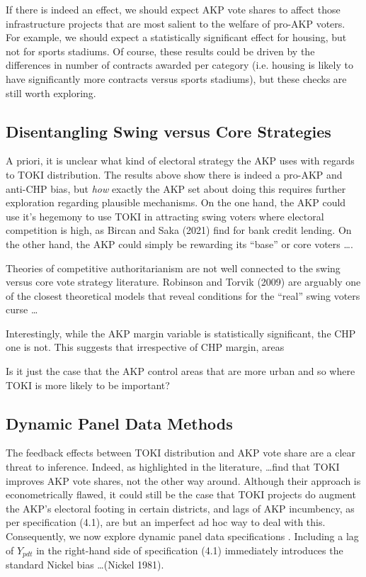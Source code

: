 \documentclass[10pt, oneside]{article}   	%
\numberwithin{equation}{section}
\begin{document}
If there is indeed an effect, we should expect AKP vote shares to affect those infrastructure projects that are most salient to the welfare of pro-AKP voters. For example, we should expect a statistically significant effect for housing, but not for sports stadiums. Of course, these results could be driven by the differences in number of contracts awarded per category (i.e. housing is likely to have significantly more contracts versus sports stadiums), but these checks are still worth exploring. 



\subsection{Disentangling Swing versus Core Strategies}

A priori, it is unclear what kind of electoral strategy the AKP uses with regards to TOKI distribution. The results above show there is indeed a pro-AKP and anti-CHP bias, but \textit{how} exactly the AKP set about doing this requires further exploration regarding plausible mechanisms. On the one hand, the AKP could use it's hegemony to use TOKI in attracting swing voters where electoral competition is high, as Bircan and Saka (2021) find for bank credit lending. On the other hand, the AKP could simply be rewarding its ``base'' or core voters \dots. 

Theories of competitive authoritarianism are not well connected to the swing versus core vote strategy literature. Robinson and Torvik (2009) are arguably one of the closest theoretical models that reveal conditions for the ``real'' swing voters curse \dots 

Interestingly, while the AKP margin variable is statistically significant, the CHP one is not. This suggests that irrespective of CHP margin, areas 

Is it just the case that the AKP control areas that are more urban and so where TOKI is more likely to be important? 

\subsection{Dynamic Panel Data Methods}

The feedback effects between TOKI distribution and AKP vote share are a clear threat to inference. Indeed, as highlighted in the literature, \dots find that TOKI improves AKP vote shares, not the other way around. Although their approach is econometrically flawed, it could still be the case that TOKI projects do augment the AKP's electoral footing in certain districts, and lags of AKP incumbency, as per specification (4.1), are but an imperfect ad hoc way to deal with this. Consequently, we now explore dynamic panel data specifications . Including a lag of $Y_{pdt}$ in the right-hand side of specification (4.1) immediately introduces the standard Nickel bias \dots (Nickel 1981). 
\end{document}
